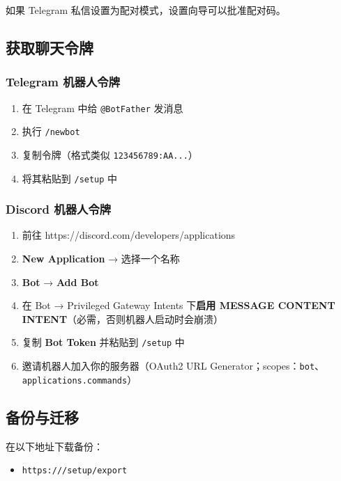 如果 Telegram 私信设置为配对模式，设置向导可以批准配对码。

\subsection{获取聊天令牌}


\subsubsection{Telegram 机器人令牌}


\begin{enumerate}
  \item 在 Telegram 中给 \texttt{@BotFather} 发消息
  \item 执行 \texttt{/newbot}
  \item 复制令牌（格式类似 \texttt{123456789:AA...}）
  \item 将其粘贴到 \texttt{/setup} 中
\end{enumerate}


\subsubsection{Discord 机器人令牌}


\begin{enumerate}
  \item 前往 https://discord.com/developers/applications
  \item \textbf{New Application} → 选择一个名称
  \item \textbf{Bot} → \textbf{Add Bot}
  \item 在 Bot → Privileged Gateway Intents 下\textbf{启用 MESSAGE CONTENT INTENT}（必需，否则机器人启动时会崩溃）
  \item 复制 \textbf{Bot Token} 并粘贴到 \texttt{/setup} 中
  \item 邀请机器人加入你的服务器（OAuth2 URL Generator；scopes：\texttt{bot}、\texttt{applications.commands}）
\end{enumerate}


\subsection{备份与迁移}


在以下地址下载备份：

\begin{itemize}
  \item \texttt{https:///setup/export}
\end{itemize}


